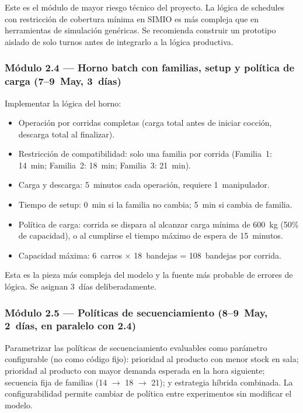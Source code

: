 \documentclass[12pt]{article}
\begin{document}
Este es el módulo de mayor riesgo técnico del proyecto. La lógica de schedules con restricción de cobertura mínima en SIMIO es más compleja que en herramientas de simulación genéricas. Se recomienda construir un prototipo aislado de solo turnos antes de integrarlo a la lógica productiva.

\subsubsection{Módulo 2.4 --- Horno batch con familias, setup y política de carga \quad(7--9~May, 3~días)}

Implementar la lógica del horno:
\begin{itemize}
  \item Operación por corridas completas (carga total antes de iniciar cocción, descarga total al finalizar).
  \item Restricción de compatibilidad: solo una familia por corrida (Familia~1: 14~min; Familia~2: 18~min; Familia~3: 21~min).
  \item Carga y descarga: 5~minutos cada operación, requiere 1~manipulador.
  \item Tiempo de setup: 0~min si la familia no cambia; 5~min si cambia de familia.
  \item Política de carga: corrida se dispara al alcanzar carga mínima de 600~kg (50\% de capacidad), o al cumplirse el tiempo máximo de espera de 15~minutos.
  \item Capacidad máxima: 6~carros $\times$ 18~bandejas = 108~bandejas por corrida.
\end{itemize}

Esta es la pieza más compleja del modelo y la fuente más probable de errores de lógica. Se asignan 3~días deliberadamente.

\subsubsection{Módulo 2.5 --- Políticas de secuenciamiento \quad(8--9~May, 2~días, en paralelo con 2.4)}

Parametrizar las políticas de secuenciamiento evaluables como parámetro configurable (no como código fijo): prioridad al producto con menor stock en sala; prioridad al producto con mayor demanda esperada en la hora siguiente; secuencia fija de familias (14 $\to$ 18 $\to$ 21); y estrategia híbrida combinada. La configurabilidad permite cambiar de política entre experimentos sin modificar el modelo.
\end{document}
